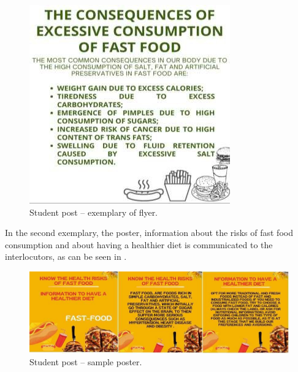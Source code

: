 \documentclass[english]{textolivre}
\begin{document}
\begin{figure}[h!]
\centering
\begin{minipage}{.5\textwidth}
 \includegraphics[width=\textwidth]{FIGURA01.jpg}
 \caption{Student post – exemplary of flyer.}
 \label{fig01}
\end{minipage}
\end{figure}

In the second exemplary, the poster, information about the risks of fast food consumption and about having a healthier diet is communicated to the interlocutors, as can be seen in . 

\begin{figure}[h!]
\centering
\begin{minipage}{.99\textwidth}
 \includegraphics[width=\textwidth]{FIGURA2.jpg}
 \caption{Student post – sample poster.}
 \label{fig02}
\end{minipage}
\end{figure}
\end{document}
